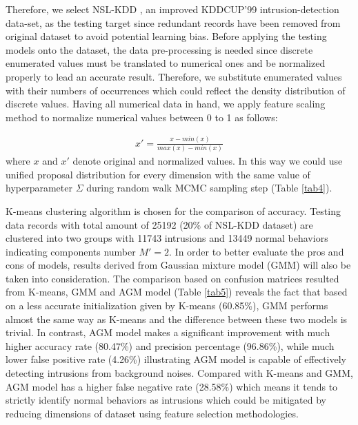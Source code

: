 Therefore, we select NSL-KDD \cite{Tavallaee2009}, an improved KDDCUP'99 intrusion-detection data-set, as the testing target since redundant records have been removed from original dataset to avoid potential learning bias. Before applying the testing models onto the dataset, the data pre-processing is needed since discrete enumerated values must be translated to numerical ones and be normalized properly to lead an accurate result. Therefore, we substitute enumerated values with their numbers of occurrences which could reflect the density distribution of discrete values. Having all numerical data in hand, we apply feature scaling method to normalize numerical values between 0 to 1 as follows:

\begin{align}
x' = \frac{x - min(x)}{max(x) - min(x)}
\label{eq:13}
\end{align}
where $x$ and $x'$ denote original and normalized values. In this way we could use unified proposal distribution for every dimension with the same value of hyperparameter $\Sigma$ during random walk MCMC sampling step (Table \ref{tab4}).

K-means clustering algorithm \cite{Hartigan1979} is chosen for the comparison of accuracy. Testing data records with total amount of 25192 (20\% of NSL-KDD dataset) are clustered into two groups with 11743 intrusions and 13449 normal behaviors indicating components number $M' = 2$. In order to better evaluate the pros and cons of models, results derived from Gaussian mixture model (GMM) will also be taken into consideration. The comparison based on confusion matrices resulted from K-means, GMM and AGM model (Table \ref{tab5}) reveals the fact that based on a less accurate initialization given by K-means (60.85\%), GMM performs almost the same way as K-means and the difference between these two models is trivial. In contrast, AGM model makes a significant improvement with much higher accuracy rate (80.47\%) and precision percentage (96.86\%), while much lower false positive rate (4.26\%) illustrating AGM model is capable of effectively detecting intrusions from background noises. Compared with K-means and GMM, AGM model has a higher false negative rate (28.58\%) which means it tends to strictly identify normal behaviors as intrusions which could be mitigated by reducing dimensions of dataset using feature selection methodologies.

